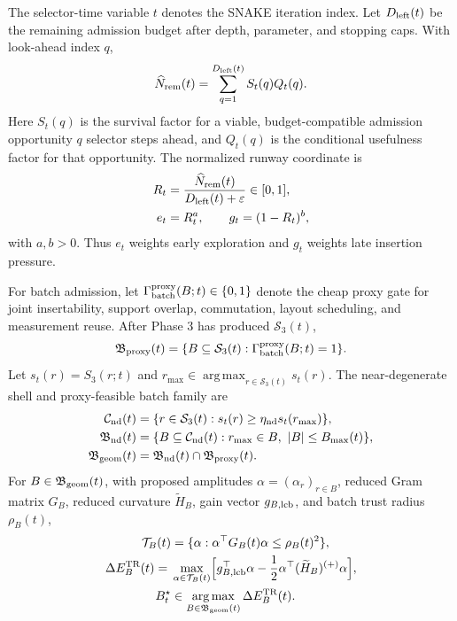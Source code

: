 \documentclass[
  reprint,
  amsmath,
  amssymb,
  aps,
  pra,
  nofootinbib,
  superscriptaddress,
  floatfix
]{revtex4-2}
\newcommand{\Sset}{\mathcal{S}}
\newcommand{\TR}{\mathrm{TR}}
\newcommand{\argmaxp}{\mathop{\mathrm{arg\,max}}}
\newcommand{\eps}{\varepsilon}
\begin{document}
The selector-time variable $t$ denotes the SNAKE iteration index. Let $D_{\rm left}(t)$ be the remaining admission budget after depth, parameter, and stopping caps. With look-ahead index $q$,
\begin{equation}
\widehat N_{\rm rem}(t)=
\sum_{q=1}^{D_{\rm left}(t)}
S_t(q)Q_t(q).
\label{eq:expected_utility_left}
\end{equation}
Here $S_t(q)$ is the survival factor for a viable, budget-compatible admission opportunity $q$ selector steps ahead, and $Q_t(q)$ is the conditional usefulness factor for that opportunity. The normalized runway coordinate is
\begin{equation}
\begin{aligned}
R_t&=\frac{\widehat N_{\rm rem}(t)}{D_{\rm left}(t)+\eps}\in[0,1],\\
e_t&=R_t^a,\qquad
g_t=(1-R_t)^b,
\end{aligned}
\label{eq:runway_coordinate}
\end{equation}
with $a,b>0$. Thus $e_t$ weights early exploration and $g_t$ weights late insertion pressure.

For batch admission, let $\Gamma_{\rm batch}^{\rm proxy}(B;t)\in\{0,1\}$ denote the cheap proxy gate for joint insertability, support overlap, commutation, layout scheduling, and measurement reuse. After Phase 3 has produced $\Sset_3(t)$,
\begin{equation}
\mathfrak B_{\rm proxy}(t)=
\{B\subseteq\Sset_3(t):\Gamma_{\rm batch}^{\rm proxy}(B;t)=1\}.
\label{eq:batch_proxy_screen}
\end{equation}
Let $s_t(r)=S_3(r;t)$ and $r_{\max}\in\argmaxp_{r\in\Sset_3(t)}s_t(r)$. The near-degenerate shell and proxy-feasible batch family are
\begin{equation}
\begin{aligned}
\mathcal C_{\rm nd}(t)
&=\{r\in\Sset_3(t):s_t(r)\ge \eta_{\rm nd}s_t(r_{\max})\},\\
\mathfrak B_{\rm nd}(t)
&=\{B\subseteq\mathcal C_{\rm nd}(t):r_{\max}\in B,\ |B|\le B_{\max}(t)\},\\
\mathfrak B_{\rm geom}(t)
&=\mathfrak B_{\rm nd}(t)\cap\mathfrak B_{\rm proxy}(t).
\end{aligned}
\label{eq:near_degenerate_shell}
\end{equation}
For $B\in\mathfrak B_{\rm geom}(t)$, with proposed amplitudes $\alpha=(\alpha_r)_{r\in B}$, reduced Gram matrix $G_B$, reduced curvature $\widetilde H_B$, gain vector $g_{B,\rm lcb}$, and batch trust radius $\rho_B(t)$,
\begin{equation}
\begin{aligned}
\mathcal T_B(t)&=\{\alpha:\alpha^{\top}G_B(t)\alpha\le \rho_B(t)^2\},\\
\Delta E_B^{\TR}(t)={}&\max_{\alpha\in\mathcal T_B(t)}
\Bigl[g_{B,\rm lcb}^{\top}\alpha
-\frac12\alpha^{\top}(\widetilde H_B)^{(+)}\alpha\Bigr],\\
B_t^{\star}&\in\argmaxp_{B\in\mathfrak B_{\rm geom}(t)}\Delta E_B^{\TR}(t).
\end{aligned}
\label{eq:batch_gain}
\end{equation}
\end{document}
